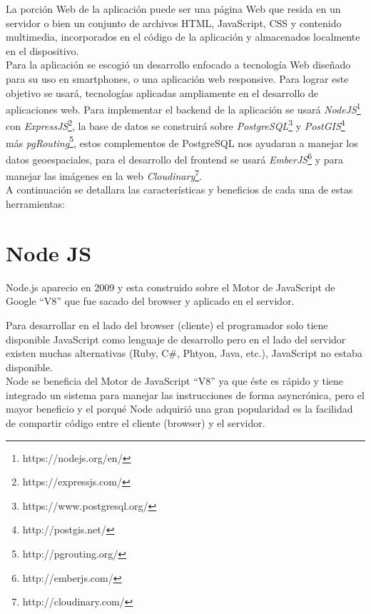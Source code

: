       La porción Web de la aplicación puede ser una página Web que resida en un servidor o bien un conjunto de archivos HTML, JavaScript, CSS y contenido multimedia, incorporados en el código de la aplicación y almacenados localmente en el dispositivo\cite{IBM_Mobile}.\\




  Para la aplicación se escogió un desarrollo enfocado a tecnología Web diseñado para su uso en smartphones, o una aplicación web responsive. Para lograr este objetivo se usará, tecnologías aplicadas ampliamente en el desarrollo de aplicaciones web.
  Para implementar el backend de la aplicación se usará \emph{NodeJS}\footnote{https://nodejs.org/en/} con \emph{ExpressJS}\footnote{https://expressjs.com/}, la base de datos se construirá sobre \emph{PostgreSQL}\footnote{https://www.postgresql.org/} y \emph{PostGIS}\footnote{http://postgis.net/} más \emph{pgRouting}\footnote{http://pgrouting.org/}, estos complementos de PostgreSQL nos ayudaran a manejar los datos geoespaciales, para el desarrollo del frontend se usará \emph{EmberJS}\footnote{http://emberjs.com/} y para manejar las imágenes en la web \emph{Cloudinary}\footnote{http://cloudinary.com/}.\\

  A continuación se detallara las características y beneficios de cada una de estas herramientas:

  \section{Node JS}
  \label{sec:node_js}
    Node.js aparecio en 2009 y esta construido sobre el Motor de JavaScript de Google ``V8'' que fue sacado del browser y aplicado en el servidor.

    Para desarrollar en el lado del browser (cliente) el programador solo tiene disponible JavaScript como lenguaje de desarrollo pero en el lado del servidor existen muchas alternativas (Ruby, C\#, Phtyon, Java, etc.), JavaScript no estaba disponible.\\

    Node se beneficia del Motor de JavaScript ``V8'' ya que \'este es r\'apido y tiene integrado un sistema para manejar las instrucciones de forma asyncr\'onica, pero el mayor beneficio y el porqu\'e Node adquiri\'o una gran popularidad es la facilidad de compartir c\'odigo entre el cliente (browser) y el servidor.\\

